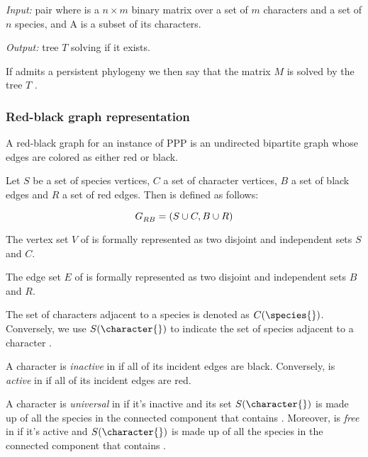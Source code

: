 \begin{definition}\label{definition:ppp}
  \text{}

  \textit{Input:} pair \ma{} where \m{} is a $n \times m$ binary matrix over a set of $m$ characters and a set of $n$ species, and A is a subset of its characters.

  \textit{Output:} tree $T$ solving \m{} if it exists.
\end{definition}

If \ma{} admits a persistent phylogeny we then say that the matrix $M$ is solved by the tree $T$ \cite{PPPptime2016,PPPcgraph2016}.

\subsubsection{Red-black graph representation}\label{section:grb}

A red-black graph for an instance of PPP is an undirected bipartite graph whose edges are colored as either red or black.

\begin{definition}\label{definition:grb}
  Let $S$ be a set of species vertices, $C$ a set of character vertices, $B$ a set of black edges and $R$ a set of red edges.
  Then \grb{} is defined as follows:

  \[ G_{RB}^{}{} = (S \cup C, B \cup R) \]

  The vertex set $V$ of \grb{} is formally represented as two disjoint and independent sets $S$ and $C$.

  The edge set $E$ of \grb{} is formally represented as two disjoint and independent sets $B$ and $R$.
\end{definition}

The set of characters adjacent to a species \species{} is denoted as $C(\species{})$.
Conversely, we use $S(\character{})$ to indicate the set of species adjacent to a character \character{}.

A character \character{} is \emph{inactive} in \grb{} if all of its incident edges are black.
Conversely, \character{} is \emph{active} in \grb{} if all of its incident edges are red.

A character \character{} is \emph{universal} in \grb{} if it's inactive and its set $S(\character{})$ is made up of all the species in the connected component that contains \character{}.
Moreover, \character{} is \emph{free} in \grb{} if it's active and $S(\character{})$ is made up of all the species in the connected component that contains \character{}.

